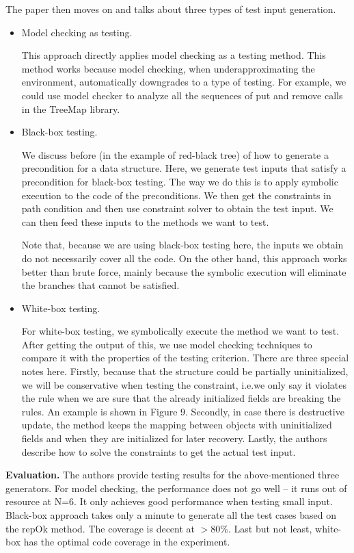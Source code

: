 \documentclass[12pt]{article}
\begin{document}
The paper then moves on and talks about three types of test input generation.
\begin{itemize}
\item Model checking as testing.

This approach directly applies model checking as a testing method. This method works because model checking, when underapproximating the environment, automatically downgrades to a type of testing. For example, we could use model checker to analyze all the sequences of put and remove calls in the TreeMap library.

\item Black-box testing.

We discuss before (in the example of red-black tree) of how to generate a precondition for a data structure. Here, we generate test inputs that satisfy a precondition for black-box testing. The way we do this is to apply symbolic execution to the code of the preconditions. We then get the constraints in path condition and then use constraint solver to obtain the test input. We can then feed these inputs to the methods we want to test.

Note that, because we are using black-box testing here, the inputs we obtain do not necessarily cover all the code. On the other hand, this approach works better than brute force, mainly because the symbolic execution will eliminate the branches that cannot be satisfied.


\item White-box testing.

For white-box testing, we symbolically execute the method we want to test. After getting the output of this, we use model checking techniques to compare it with the properties of the testing criterion. There are three special notes here. Firstly, because that the structure could be partially uninitialized, we will be conservative when testing the constraint, i.e.we only say it violates the rule when we are sure that the already initialized fields are breaking the rules. An example is shown in Figure 9. Secondly, in case there is destructive update, the method keeps the mapping between objects with uninitialized fields and when they are initialized for later recovery. Lastly, the authors describe how to solve the constraints to get the actual test input. 

\end{itemize}

\noindent
\textbf{Evaluation.} The authors provide testing results for the above-mentioned three generators. For model checking, the performance does not go well -- it runs out of resource at N=6. It only achieves good performance when testing small input. Black-box approach takes only a minute to generate all the test cases based on the repOk method. The coverage is decent at $>$80\%. Last but not least, white-box has the optimal code coverage in the experiment.
\end{document}
